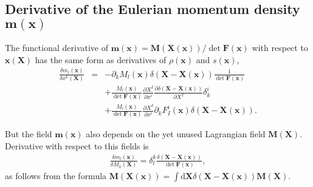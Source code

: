 \documentclass[
10pt, %
a4paper, %
oneside, %
headinclude,footinclude, %
BCOR5mm, %
]{scrartcl}
\newcommand{\xx}{\mathbf{x}}
\newcommand{\XX}{\mathbf{X}}
\newcommand{\dX}{\mathrm{d}\XX}
\newcommand{\mm}{\mathbf{m}}
\newcommand{\MM}{\mathbf{M}}
\newcommand{\FF}{\mathbf{F}}
\begin{document}
\subsection{Derivative of the Eulerian momentum density $\mm(\xx)$}
The functional derivative of $\mm(\xx)=\MM(\XX(\xx))/\det \FF(\xx)$ with respect to $\xx(\XX)$ has the same form as derivatives of $\rho(\xx)$ and $s(\xx)$,
\begin{eqnarray}
	\frac{\delta m_l(\xx)}{\delta x^k(\XX)}&=&
	-\partial_k M_l(\xx) \delta(\XX-\XX(\xx))\frac{1}{\det\FF(\xx)}\nonumber\\
	&&
	+\frac{M_l(\xx)}{\det \FF(\xx)} \frac{\partial X^I}{\partial x^i} \frac{\partial \delta(\XX-\XX(\xx))}{\partial X^I}\delta^i_k \nonumber\\
	&&+\frac{M_l(\xx)}{\det \FF(\xx)} \frac{\partial X^I}{\partial x^i} \partial_k F^i_I(\xx)\delta(\XX-\XX(\xx)).
\end{eqnarray}

But the field $\mm(\xx)$ also depends on the yet unused Lagrangian field $\MM(\XX)$. Derivative with respect to this fields is
\begin{eqnarray}\label{eq.mM}
	\frac{\delta m_l(\xx)}{\delta M_k(\XX)} = \delta^k_l \frac{\delta(\XX-\XX(\xx))}{\det\FF(\xx)},
\end{eqnarray}
as follows from the formula $\MM(\XX(\xx)) = \int\dX \delta(\XX-\XX(\xx)) \MM(\XX)$.
\end{document}
